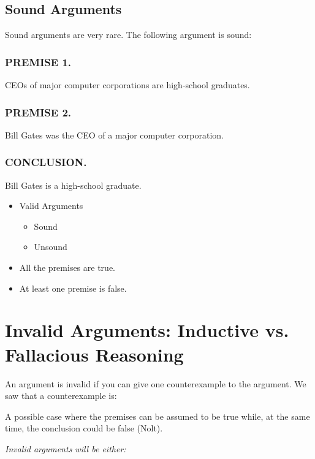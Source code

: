 \documentclass{article}
\begin{document}
\subsection{Sound Arguments}

Sound arguments are very rare.
The following argument is sound:

\subsubsection{PREMISE 1.}
CEOs of major computer corporations are high-school graduates.

\subsubsection{PREMISE 2.}
Bill Gates was the CEO of a major computer corporation.

\subsubsection{CONCLUSION.}
Bill Gates is a high-school graduate.

\begin{itemize}
  \item Valid Arguments
    \begin{itemize}
      \item Sound
      \item Unsound
    \end{itemize}
\end{itemize}

\begin{itemize}
  \item All the premises are true.
  \item At least one premise is false.
\end{itemize}

    \section{Invalid Arguments: Inductive vs.  Fallacious Reasoning}

An argument is invalid if you can give one counterexample to the argument.
We saw that a counterexample is:

A possible case where the premises can be assumed to be true while, at the same time, the conclusion could be false (Nolt).

    \textit{Invalid arguments will be either:}
\end{document}
